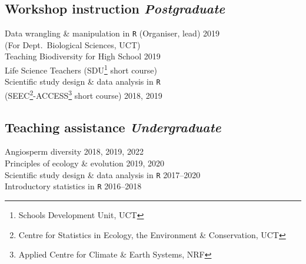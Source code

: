 \documentclass[10pt]{article}
\begin{document}
\begin{multicols}{2} %

\subsection*{Workshop instruction %
                                 \hfill {\small \textmd{\textit{Postgraduate}}}}

Data wrangling \& manipulation in \texttt{R}
  {\small (Organiser, lead)}                       \hfill {\small       2019} \\
  \hspace{2em} {\small (For Dept.~Biological Sciences, UCT)}                  \\
Teaching Biodiversity for High School              \hfill {\small       2019} \\
  \hspace{2em} Life Science Teachers {\small (SDU\footnote{
    Schools Development Unit, UCT} short course)}                             \\
Scientific study design \& data analysis in \texttt{R}                        \\
  \hspace{2em} {\small(SEEC\footnote{Centre for Statistics in
  Ecology, the Environment \&
  Conservation, UCT}-ACCESS\footnote{Applied
  Centre for Climate \& Earth Systems, NRF}
  short course)}                                   \hfill {\small 2018, 2019}

\subsection*{Teaching assistance %
                                \hfill {\small \textmd{\textit{Undergraduate}}}}

Angiosperm diversity                         \hfill {\small 2018, 2019, 2022} \\
Principles of ecology \& evolution           \hfill {\small       2019, 2020} \\
Scientific study design \& data analysis in \texttt{R}
                                             \hfill {\small       2017--2020} \\
Introductory statistics in \texttt{R}        \hfill {\small       2016--2018}


\end{multicols}
\end{document}
